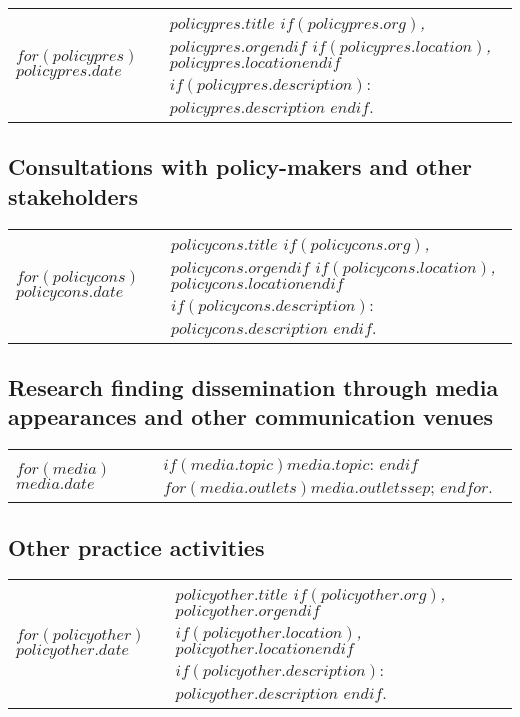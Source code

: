 \documentclass[martgin, line]{article}
\begin{document}
\setlength{\extrarowheight}{.75em}
\begin{longtable}[l]{lp{5in}}   
$for(policypres)$
$policypres.date$&
\parbox[t]{5in}{
    \textit{$policypres.title$%
    $if(policypres.org)$, $policypres.org$$endif$%
    $if(policypres.location)$, $policypres.location$$endif$}%
    $if(policypres.description)$: %
    $policypres.description$%
    $endif$.%
  }\\
$endfor$
\end{longtable}
\setlength{\extrarowheight}{0em}

\subsection*{Consultations with policy-makers and other
  stakeholders}

\setlength{\extrarowheight}{.75em}
\begin{longtable}[l]{lp{5in}}   
$for(policycons)$
$policycons.date$&
\parbox[t]{5in}{
    \textit{$policycons.title$%
    $if(policycons.org)$, $policycons.org$$endif$%
    $if(policycons.location)$, $policycons.location$$endif$}%
    $if(policycons.description)$: %
    $policycons.description$%
    $endif$.%
  }\\
$endfor$
\end{longtable}
\setlength{\extrarowheight}{0em}

\subsection*{Research finding dissemination through media appearances
  and other communication venues}


\setlength{\extrarowheight}{.75em}
\begin{longtable}[l]{lp{5in}}   
$for(media)$
$media.date$&
\parbox[t]{5in}{
    $if(media.topic)$$media.topic$: $endif$%
    $for(media.outlets)$$media.outlets$$sep$; $endfor$.%
  }\\
$endfor$
\end{longtable}
\setlength{\extrarowheight}{0em}


\subsection*{Other practice activities}

\setlength{\extrarowheight}{.75em}
\begin{longtable}[l]{lp{5in}}   
$for(policyother)$
$policyother.date$&
\parbox[t]{5in}{
    \textit{$policyother.title$%
    $if(policyother.org)$, $policyother.org$$endif$%
    $if(policyother.location)$, $policyother.location$$endif$}%
    $if(policyother.description)$: %
    $policyother.description$%
    $endif$.%
  }\\
$endfor$
\end{longtable}
\setlength{\extrarowheight}{0em}

\end{document}
